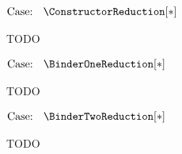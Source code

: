 $\text{Case: }\begin{array}{c} \ConstructorReduction[*] \end{array}$
\begin{proofcase}
    TODO
\end{proofcase}

$\text{Case: }\begin{array}{c} \BinderOneReduction[*] \end{array}$
\begin{proofcase}
    TODO
\end{proofcase}

$\text{Case: }\begin{array}{c} \BinderTwoReduction[*] \end{array}$
\begin{proofcase}
    TODO
\end{proofcase}

